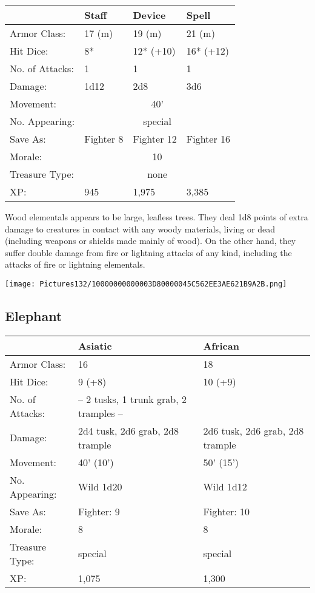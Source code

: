 \documentclass[a4paper,twoside,openany,10pt]{book}
\begin{document}
\begin{multicols}{2}
\begin{tabularx}{0.48\textwidth}{@{}lllX@{}}
& Staff & Device & Spell \\\hline
Armor Class: & 17 (m) & 19 (m) & 21 (m) \\\hline
Hit Dice: & 8* & 12* (+10) & 16* (+12) \\\hline
No. of Attacks: & 1 & 1 & 1 \\\hline
Damage: & 1d12 & 2d8 & 3d6 \\\hline
Movement:  & \multicolumn{3}{c}{40'}\\\hline
No. Appearing: &\multicolumn{3}{c}{special} \\\hline
Save As: & Fighter 8 & Fighter 12 & Fighter 16 \\\hline
Morale: & \multicolumn{3}{c}{10} \\\hline
Treasure Type: & \multicolumn{3}{c}{none} \\\hline
XP: & 945 & 1,975 & 3,385 \\\hline
\end{tabularx}\medskip

Wood elementals appears to be large, leafless trees. They deal 1d8 points of extra damage to creatures in contact with any woody materials, living or dead (including weapons or shields made mainly of wood). On the other hand, they suffer double damage from fire or lightning attacks of any kind, including the attacks of fire or lightning elementals.\\

\begin{center}
	\texttt{[image: Pictures132/10000000000003D80000045C562EE3AE621B9A2B.png]}

\end{center}


\subsection*{Elephant}\label{elephant}

\begin{tabularx}{0.48\textwidth}{@{}lXX@{}}
& Asiatic & African \\\hline
Armor Class: & 16 & 18 \\\hline
Hit Dice: & 9 (+8) & 10 (+9) \\\hline
No. of Attacks: & -- 2 tusks, 1 trunk grab, 2 tramples -- & \\\hline
Damage: & 2d4 tusk, 2d6 grab, 2d8 trample & 2d6 tusk, 2d6 grab, 2d8 trample \\\hline
Movement: & 40' (10') & 50' (15') \\\hline
No. Appearing: & Wild 1d20 & Wild 1d12 \\\hline
Save As: & Fighter: 9 & Fighter: 10 \\\hline
Morale: & 8 & 8 \\\hline
Treasure Type: & special & special \\\hline
XP: & 1,075 & 1,300 \\\hline
\end{tabularx}\medskip


\end{multicols}
\end{document}
